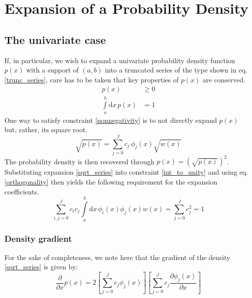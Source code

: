 \documentclass[]{report}
\begin{document}
\chapter{Expansion of a Probability Density}
	\section{The univariate case}
	If, in particular, we wish to expand a univariate probability density function $p(x)$ with a support of $(a,b)$ into a truncated series of the type shown in eq. \ref{trunc_series}, care has to be taken that key properties of $p(x)$ are conserved.
	\begin{align}
		p(x) & \ge 0 \label{nonnegativity}\\
		\int\limits_a^b\mathrm{d}x\,p(x) & = 1 \label{int_to_unity}
	\end{align}	
	One way to satisfy constraint \ref{nonnegativity} is to not directly expand $p(x)$ but, rather, its square root.
	\begin{equation}\label{sqrt_series}
		\sqrt{p(x)} = \sum_{j=0}^{J}c_j\,\phi_j(x)\sqrt{w(x)}
	\end{equation}
	The probability density is then recovered through $p(x)=\left(\sqrt{p(x)}\right)^2$. Substituting expansion \ref{sqrt_series} into constraint \ref{int_to_unity} and using eq. \ref{orthogonality} then yields the following requirement for the expansion coefficients.
	\begin{equation}\label{coeff_sqr_norm}
		\sum_{i, j=0}^{J}c_ic_j\int\limits_a^b\mathrm{d}x\,\phi_i(x)\phi_j(x)w(x) = \sum_{j=0}^{J}c_j^2 = 1
	\end{equation}
	
		\subsection{Density gradient}
		For the sake of completeness, we note here that the gradient of the density \ref{sqrt_series} is given by:
		\begin{equation}
			\frac{\partial}{\partial x}p(x) = 2\left[\sum_{j=0}^Jc_j\phi_j(x)\right]\left[\sum_{j=0}^Jc_j\frac{\partial\phi_j(x)}{\partial x}\right]
		\end{equation}
	
\end{document}
